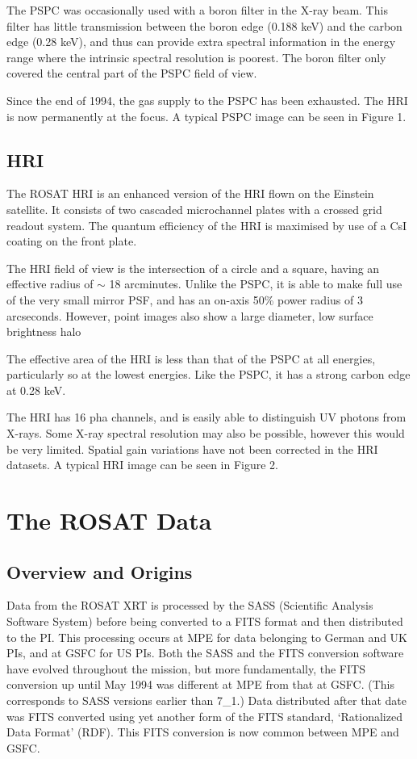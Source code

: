 \documentclass[11pt,fleqn]{article}    %
\begin{document}
The PSPC was occasionally used with a boron filter in the X-ray beam.
This filter has little transmission between the boron edge (0.188 keV)
and the carbon edge (0.28 keV), and thus can provide extra spectral
information in the energy range where the intrinsic spectral resolution
is poorest. The boron filter only covered the central part of the PSPC
field of view.

Since the end of 1994, the gas supply to the PSPC has been exhausted.
The HRI is now permanently at the focus.  A typical PSPC image can be seen
in Figure 1.
  
\subsection{HRI}
The ROSAT HRI is an enhanced version of the HRI flown on the Einstein
satellite. It consists of two cascaded microchannel plates with a crossed
grid readout system. The quantum efficiency of the HRI is maximised by
use of a CsI coating on the front plate.
 
The HRI field of view is the intersection of a circle and a square,
having an effective radius of $\sim$ 18 arcminutes. Unlike the PSPC, it
is able to make full use of the very small mirror PSF, and has an on-axis 
50\% power radius of 3 arcseconds. However, point images also show a large
diameter, low surface brightness halo

The effective area of the HRI is less than that of the PSPC at all
energies, particularly so at the lowest energies. Like the PSPC, it has a
strong carbon edge at 0.28 keV.

The HRI has 16 pha channels, and is easily able to distinguish UV photons from
X-rays. Some X-ray spectral resolution may also be possible, however
this would be very limited. Spatial gain variations 
have not been corrected in the HRI datasets.  A typical HRI image can be
seen in Figure 2.

\newpage
\section{The ROSAT Data}

\subsection{Overview and Origins}
Data from the ROSAT XRT is processed by the SASS (Scientific Analysis
Software System) before being converted to a FITS format and then
distributed to the PI. This processing occurs at MPE for data belonging
to German and UK PIs, and at GSFC for US PIs. Both the SASS and the FITS
conversion software have evolved throughout the mission, but more
fundamentally, the FITS conversion up until May 1994 was different at MPE
from that at GSFC. (This corresponds to SASS versions earlier than 7\_1.) 
Data distributed after that date was FITS converted
using yet another form of the FITS standard, `Rationalized Data Format'
(RDF). This FITS conversion is now common between MPE and GSFC.
\end{document}
